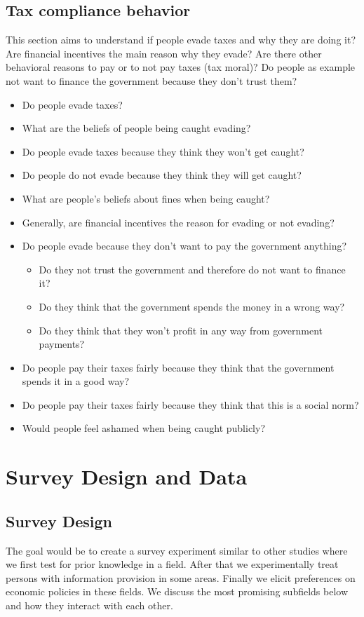 \documentclass[a4paper, 12pt]{article}
\begin{document}
\subsection{Tax compliance behavior}
This section aims to understand if people evade taxes and why they are doing it? Are financial incentives the main reason why they evade? Are there other behavioral reasons to pay or to not pay taxes (tax moral)? Do people as example not want to finance the government because they don't trust them?   
\begin{itemize}
    \item Do people evade taxes?
    \item What are the beliefs of people being caught evading?
    \item Do people evade taxes because they think they won't get caught?
    \item Do people do not evade because they think they will get caught?
    \item What are people's beliefs about fines when being caught?
    \item Generally, are financial incentives the reason for evading or not evading?
    \item Do people evade because they don't want to pay the government anything?
    \begin{itemize}
        \item Do they not trust the government and therefore do not want to finance it?
        \item Do they think that the government spends the money in a wrong way? 
        \item Do they think that they won't profit in any way from government payments? 
    \end{itemize}
    \item Do people pay their taxes fairly because they think that the government spends it in a good way?
    \item Do people pay their taxes fairly because they think that this is a social norm?
    \item Would people feel ashamed when being caught publicly?
\end{itemize}

\section{Survey Design and Data}
\subsection{Survey Design}
The goal would be to create a survey experiment similar to other studies where we first test for prior knowledge in a field. After that we experimentally treat persons with information provision in some areas. Finally we elicit preferences on economic policies in these fields. 
We discuss the most promising subfields below and how they interact with each other. 
\end{document}
